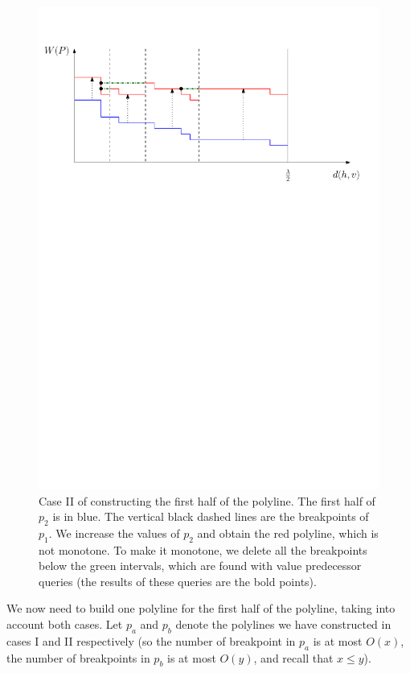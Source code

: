 \documentclass[11pt,a4paper]{article}
\theoremstyle{definition}
\theoremstyle{remark}
\begin{document}
\begin{figure}[h]
\begin{center}
\includegraphics[scale=0.6]{polyline_first_half_construction_case2}
\end{center}
\caption{Case II of constructing the first half of the polyline. The first half of $p_2$ is in blue. The vertical black dashed lines are the breakpoints of $p_1$. We increase the values of $p_{2}$ and obtain the red polyline, which is not monotone. To make it monotone, we delete all the breakpoints below the green intervals, which are found with value predecessor queries (the results of these queries are the bold points).\label{figure of the second case in the construction of the first half of the polyline}
}
\end{figure}

\vspace{0.04in} 
We now need to build one polyline for the first half of the polyline, taking into account both cases. Let $p_a$ and $p_b$ denote the polylines we have constructed in cases I and II respectively (so the number of breakpoint in $p_a$ is at most $O(x)$, the number of breakpoints in $p_b$ is at most $O(y)$, and recall that $x\leq y$).
\end{document}
